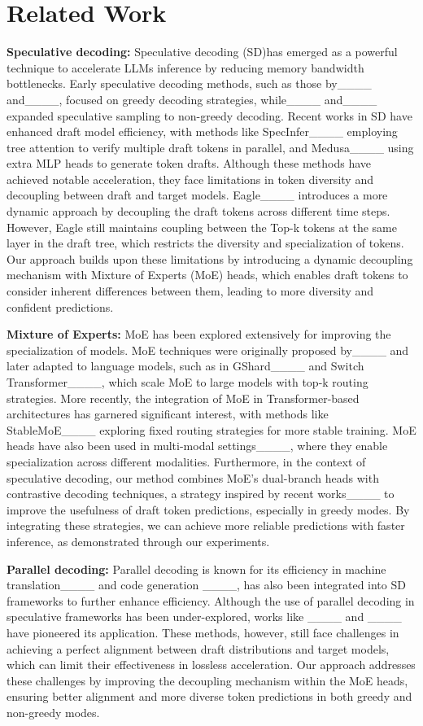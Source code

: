 \section{Related Work}
{\bf Speculative decoding:}
Speculative decoding (SD)has emerged as a powerful technique to accelerate LLMs inference by reducing memory bandwidth bottlenecks. Early speculative decoding methods, such as those by____ and____, focused on greedy decoding strategies, while____ and____ expanded speculative sampling to non-greedy decoding. Recent works in SD have enhanced draft model efficiency, with methods like SpecInfer____ employing tree attention to verify multiple draft tokens in parallel, and Medusa____ using extra MLP heads to generate token drafts. Although these methods have achieved notable acceleration, they face limitations in token diversity and decoupling between draft and target models. Eagle____ introduces a more dynamic approach by decoupling the draft tokens across different time steps. However, Eagle still maintains coupling between the Top-k tokens at the same layer in the draft tree, which restricts the diversity and specialization of tokens. Our approach builds upon these limitations by introducing a dynamic decoupling mechanism with Mixture of Experts (MoE) heads, which enables draft tokens to consider inherent differences between them, leading to more diversity and confident predictions.

{\bf Mixture of Experts:}
MoE has been explored extensively for improving the specialization of models. MoE techniques were originally proposed by____ and later adapted to language models, such as in GShard____ and Switch Transformer____, which scale MoE to large models with top-k routing strategies. More recently, the integration of MoE in Transformer-based architectures has garnered significant interest, with methods like StableMoE____ exploring fixed routing strategies for more stable training. MoE heads have also been used in multi-modal settings____, where they enable specialization across different modalities. Furthermore, in the context of speculative decoding, our method combines MoE's dual-branch heads with contrastive decoding techniques, a strategy inspired by recent works____ to improve the usefulness of draft token predictions, especially in greedy modes. By integrating these strategies, we can achieve more reliable predictions with faster inference, as demonstrated through our experiments.

{\bf Parallel decoding:}
Parallel decoding is known for its efficiency in machine translation____ and code generation ____, has also been integrated into SD frameworks to further enhance efficiency. Although the use of parallel decoding in speculative frameworks has been under-explored, works like ____ and ____ have pioneered its application. These methods, however, still face challenges in achieving a perfect alignment between draft distributions and target models, which can limit their effectiveness in lossless acceleration. Our approach addresses these challenges by improving the decoupling mechanism within the MoE heads, ensuring better alignment and more diverse token predictions in both greedy and non-greedy modes.

